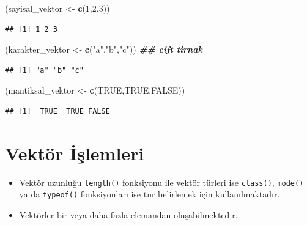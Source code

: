 \documentclass[
  oneside]{book}
\newenvironment{Shaded}{\begin{snugshade}}{\end{snugshade}}
\newcommand{\ConstantTok}[1]{\textcolor[rgb]{0.56,0.35,0.01}{#1}}
\newcommand{\DecValTok}[1]{\textcolor[rgb]{0.00,0.00,0.81}{#1}}
\newcommand{\DocumentationTok}[1]{\textcolor[rgb]{0.56,0.35,0.01}{\textbf{\textit{#1}}}}
\newcommand{\FunctionTok}[1]{\textcolor[rgb]{0.13,0.29,0.53}{\textbf{#1}}}
\newcommand{\NormalTok}[1]{#1}
\newcommand{\OtherTok}[1]{\textcolor[rgb]{0.56,0.35,0.01}{#1}}
\newcommand{\StringTok}[1]{\textcolor[rgb]{0.31,0.60,0.02}{#1}}
\begin{document}
\begin{Shaded}
\begin{Highlighting}[]
\NormalTok{(sayisal\_vektor }\OtherTok{\textless{}{-}}  \FunctionTok{c}\NormalTok{(}\DecValTok{1}\NormalTok{,}\DecValTok{2}\NormalTok{,}\DecValTok{3}\NormalTok{))}
\end{Highlighting}
\end{Shaded}

\begin{verbatim}
## [1] 1 2 3
\end{verbatim}

\begin{Shaded}
\begin{Highlighting}[]
\NormalTok{(karakter\_vektor }\OtherTok{\textless{}{-}}  \FunctionTok{c}\NormalTok{(}\StringTok{"a"}\NormalTok{,}\StringTok{"b"}\NormalTok{,}\StringTok{"c"}\NormalTok{))  }\DocumentationTok{\#\# cift tirnak}
\end{Highlighting}
\end{Shaded}

\begin{verbatim}
## [1] "a" "b" "c"
\end{verbatim}

\begin{Shaded}
\begin{Highlighting}[]
\NormalTok{(mantiksal\_vektor }\OtherTok{\textless{}{-}} \FunctionTok{c}\NormalTok{(}\ConstantTok{TRUE}\NormalTok{,}\ConstantTok{TRUE}\NormalTok{,}\ConstantTok{FALSE}\NormalTok{))}
\end{Highlighting}
\end{Shaded}

\begin{verbatim}
## [1]  TRUE  TRUE FALSE
\end{verbatim}

\hypertarget{vektuxf6r-iux15flemleri}{%
\section{Vektör İşlemleri}\label{vektuxf6r-iux15flemleri}}

\begin{itemize}
\item
  Vektör uzunluğu \texttt{length()} fonksiyonu ile vektör türleri ise \texttt{class()}, \texttt{mode()} ya da \texttt{typeof()} fonksiyonları ise tur belirlemek için kullanılmaktadır.
\item
  Vektörler bir veya daha fazla elemandan oluşabilmektedir.
\end{itemize}
\end{document}
